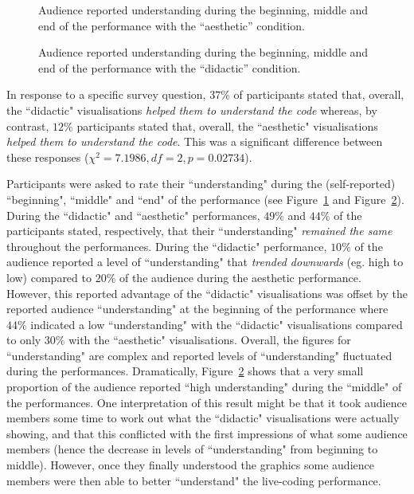 \documentclass{sig-alternate}
\begin{document}
\begin{figure}
\centering
{}
\caption{Audience reported understanding during the beginning, middle and end of the performance with the ``aesthetic'' condition.}
\label{fig:aesthetic-understanding}
\end{figure}

\begin{figure}
\centering
{}
\caption{Audience reported understanding during the beginning, middle and end of the performance with the ``didactic'' condition.}
\label{fig:didactic-understanding}
\end{figure}

In response to a specific survey question, $37\%$ of participants stated that, overall, the ``didactic" visualisations \textit{helped them to understand the code} whereas, by contrast, $12\%$ participants stated that, overall, the ``aesthetic" visualisations \textit{helped them to understand the code}. This was a significant difference between these responses ($\chi^2=7.1986,df=2,p=0.02734$).

Participants were asked to rate their ``understanding" during the (self-reported) ``beginning", ``middle" and ``end" of the performance (see Figure~\ref{fig:aesthetic-understanding} and Figure~\ref{fig:didactic-understanding}). During the ``didactic" and ``aesthetic" performances, $49\%$ and $44\%$ of the participants stated, respectively, that their ``understanding" \textit{remained the same} throughout the performances. During the ``didactic" performance, $10\%$ of the audience reported a level of ``understanding" that \textit{trended downwards} (eg. high to low) compared to $20\%$ of the audience during the aesthetic performance. However, this reported advantage of the ``didactic" visualisations was offset by the reported audience ``understanding" at the beginning of the performance where $44\%$ indicated a low ``understanding" with the ``didactic" visualisations compared to only $30\%$ with the ``aesthetic" visualisations. Overall, the figures for ``understanding" are complex and reported levels of ``understanding" fluctuated during the performances. Dramatically, Figure~\ref{fig:didactic-understanding} shows that a very small proportion of the audience reported ``high understanding" during the ``middle" of the performances. One interpretation of this result might be that it took audience members some time to work out what the ``didactic" visualisations were actually showing, and that this conflicted with the first impressions of what some audience members (hence the decrease in levels of ``understanding" from beginning to middle). However, once they finally understood the graphics some audience members were then able to better ``understand" the live-coding performance. 
\end{document}
